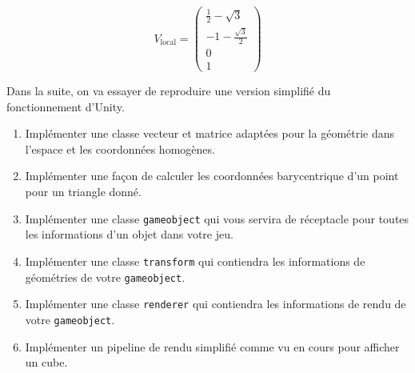 \documentclass[a4paper,12pt]{article}
\begin{document}
\begin{enumerate}
      \[
      V_{\text{local}} =
      \begin{pmatrix}
      \frac{1}{2} - \sqrt{3} \\
      -1 - \frac{\sqrt{3}}{2} \\
      0 \\
      1
      \end{pmatrix}
      \]

\end{enumerate}

\label{exo:impl}

Dans la suite, on va essayer de reproduire une version simplifié du fonctionnement d'Unity. 

\begin{enumerate}
  \item Implémenter une classe vecteur et matrice adaptées pour la géométrie dans l'espace et les coordonnées homogènes.
  \item Implémenter une façon de calculer les coordonnées barycentrique d'un point pour un triangle donné. 
  \item Implémenter une classe \texttt{gameobject} qui vous servira de réceptacle pour toutes les informations d'un objet dans votre jeu.
  \item Implémenter une classe \texttt{transform} qui contiendra les informations de géométries de votre \texttt{gameobject}.
  \item Implémenter une classe \texttt{renderer} qui contiendra les informations de rendu de votre \texttt{gameobject}.
  \item Implémenter un pipeline de rendu simplifié comme vu en cours pour afficher un cube.
\end{enumerate}
\end{document}
